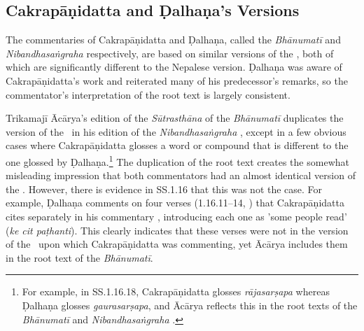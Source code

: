 \subsection{Cakrapāṇidatta and Ḍalhaṇa's Versions}
The commentaries of Cakrapāṇidatta and Ḍalhaṇa, called the \emph{Bhānumatī} and \emph{Nibandhasaṅgraha} respectively, are based on similar versions of the \SS, both of which are significantly different to the Nepalese version. Ḍalhaṇa was aware of Cakrapāṇidatta's work and reiterated many of his predecessor's remarks, so the commentator's interpretation of the root text is largely consistent. 

Trikamajī Ācārya's edition of the \textit{Sūtrasthāna} of the \emph{Bhānumatī} \citep{acar-1939} duplicates the version of the \SS\ in his edition of the \emph{Nibandhasaṅgraha} \citep{vulgate}, except in a few obvious cases where Cakrapāṇidatta glosses a word or compound that is different to the one glossed by Ḍalhaṇa.\footnote{For example, in SS.1.16.18, Cakrapāṇidatta glosses \emph{rājasarṣapa} whereas Ḍalhaṇa glosses \emph{gaurasarṣapa}, and Ācārya reflects this in the root texts of the \emph{Bhānumatī} \citep[130]{acar-1939} and \emph{Nibandhasaṅgraha} \citep[79]{vulgate}.} The duplication of the root text creates the somewhat misleading impression that both commentators had an almost identical version of the \SS. However, there is evidence in SS.1.16 that this was not the case. For example, Ḍalhaṇa comments on four verses (1.16.11–14, \cite[78]{vulgate}) that Cakrapāṇidatta cites separately in his commentary \citep[128–129]{acar-1939}, introducing each one as 'some people read' (\emph{ke cit paṭhanti}). This clearly indicates that these verses were not in the version of the \SS\ upon which Cakrapāṇidatta was commenting, yet Ācārya includes them in the root text of the \emph{Bhānumatī}.

